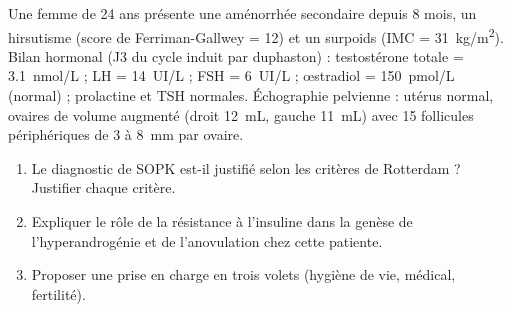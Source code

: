 \documentclass[11pt]{article}
\begin{document}
\begin{exercice}
Une femme de 24 ans présente une aménorrhée secondaire depuis 8 mois, un hirsutisme (score de Ferriman-Gallwey = 12) et un surpoids (IMC = \SI{31}{kg/m^2}). Bilan hormonal (J3 du cycle induit par duphaston) : testostérone totale = \SI{3,1}{nmol/L} ; LH = \SI{14}{UI/L} ; FSH = \SI{6}{UI/L} ; œstradiol = \SI{150}{pmol/L} (normal) ; prolactine et TSH normales. Échographie pelvienne : utérus normal, ovaires de volume augmenté (droit \SI{12}{mL}, gauche \SI{11}{mL}) avec 15 follicules périphériques de 3 à \SI{8}{mm} par ovaire.
\begin{enumerate}
\item Le diagnostic de SOPK est-il justifié selon les critères de Rotterdam ? Justifier chaque critère.
\item Expliquer le rôle de la résistance à l'insuline dans la genèse de l'hyperandrogénie et de l'anovulation chez cette patiente.
\item Proposer une prise en charge en trois volets (hygiène de vie, médical, fertilité).
\end{enumerate}
\end{exercice}
\end{document}
